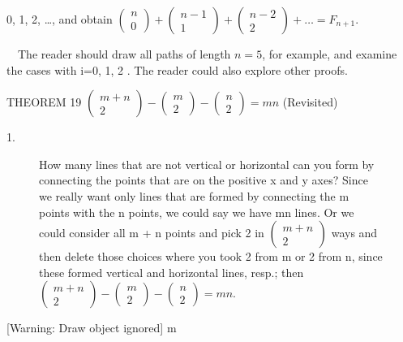 \documentclass{article}
\begin{document}
 0, 1, 2, …, and obtain 
$\left(\begin{matrix}n\\0\end{matrix}\right)+\left(\begin{matrix}n-1\\1\end{matrix}\right)+\left(\begin{matrix}n-2\\2\end{matrix}\right)+{\dots}=F_{n+1}$.

\ \ The reader should draw all paths of length  $n=5$, for example, and examine the cases with i=0, 1, 2 . The reader
could also explore other proofs.

THEOREM 19  
$\left(\begin{matrix}m+n\\2\end{matrix}\right)-\left(\begin{matrix}m\\2\end{matrix}\right)-\left(\begin{matrix}n\\2\end{matrix}\right)=\mathit{mn}$
(Revisited)

1.\ \ \ \ \ \ \ \ \ \ \ \ \ \ \ \ \ \ \ \ \ \ 

\begin{figure}
\centering
\begin{minipage}{4.3752in}
How many lines that are not vertical or horizontal can you form by connecting the points that are on the positive  x 
and  y axes?  Since we really want only lines that are formed by connecting the  m  points with the  n  points, we
could say we have  mn lines.  Or we could consider all m +  n  points and pick 2 in 
$\left(\begin{matrix}m+n\\2\end{matrix}\right)$ ways and then delete those choices where you took  2  from  m  or  2
from n, since these formed vertical and horizontal lines, resp.; then 
$\left(\begin{matrix}m+n\\2\end{matrix}\right)-\left(\begin{matrix}m\\2\end{matrix}\right)-\left(\begin{matrix}n\\2\end{matrix}\right)=\mathit{mn}$.
\end{minipage}
\end{figure}
[Warning: Draw object ignored]  m
\end{document}
